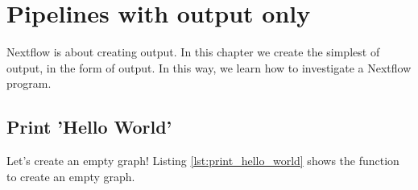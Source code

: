 \chapter{Pipelines with output only}
\label{sec:Pipelines-with-output-only}

Nextflow is about creating output.
In this chapter we create the simplest of output, 
in the form of output.
In this way, we learn how to investigate a Nextflow program.

\section{Print 'Hello World'}
\label{subsec:print-hello-world}

Let's create an empty graph! 
Listing \ref{lst:print_hello_world} 
shows the function to create an empty graph.



